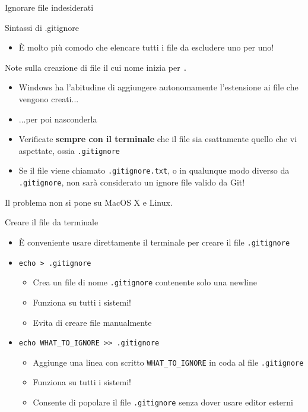 \documentclass[xcolor=dvipsnames,presentation]{beamer}
\begin{document}
\begin{frame}{Ignorare file indesiderati}
\begin{block}{Sintassi di .gitignore}
\begin{itemize}
\begin{itemize}
                \item È molto più comodo che elencare tutti i file da escludere uno per uno!
            \end{itemize}
        \end{itemize}
    \end{block}
    \begin{block}{Note sulla creazione di file il cui nome inizia per \texttt{.}}
        \begin{itemize}
            \item Windows ha l'abitudine di aggiungere autonomamente l'estensione ai file che vengono creati...
            \item ...per poi nasconderla
            \item Verificate \textbf{sempre con il terminale} che il file sia esattamente quello che vi aspettate, ossia \texttt{.gitignore}
            \item Se il file viene chiamato \texttt{.gitignore.txt}, o in qualunque modo diverso da \texttt{.gitignore}, non sarà considerato un ignore file valido da Git!
        \end{itemize}
        Il problema non si pone su MacOS X e Linux.
    \end{block}
    \begin{block}{Creare il file da terminale}
        \begin{itemize}
            \item È conveniente usare direttamente il terminale per creare il file \texttt{.gitignore}
            \item \texttt{echo > .gitignore}
            \begin{itemize}
                \item Crea un file di nome \texttt{.gitignore} contenente solo una newline
                \item Funziona su tutti i sistemi!
                \item Evita di creare file manualmente
            \end{itemize}
            \item \texttt{echo WHAT\_TO\_IGNORE >> .gitignore}
            \begin{itemize}
                \item Aggiunge una linea con scritto \texttt{WHAT\_TO\_IGNORE} in coda al file \texttt{.gitignore}
                \item Funziona su tutti i sistemi!
                \item Consente di popolare il file \texttt{.gitignore} senza dover usare editor esterni

\end{itemize}
\end{itemize}
\end{block}
\end{frame}
\end{document}
